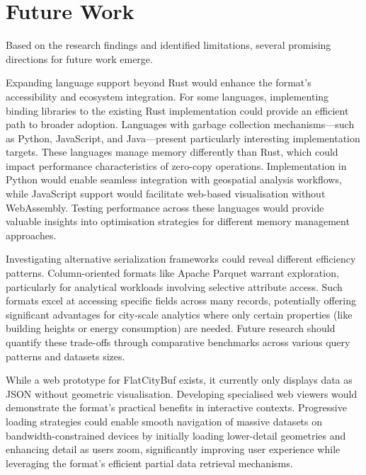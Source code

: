 \section{Future Work}
\label{conclusion:future_work}

Based on the research findings and identified limitations, several promising directions for future work emerge.

Expanding language support beyond Rust would enhance the format's accessibility and ecosystem integration. For some languages, implementing binding libraries to the existing Rust implementation could provide an efficient path to broader adoption.
Languages with garbage collection mechanisms—such as Python, JavaScript, and Java—present particularly interesting implementation targets. These languages manage memory differently than Rust, which could impact performance characteristics of zero-copy operations. Implementation in Python would enable seamless integration with geospatial analysis workflows, while JavaScript support would facilitate web-based visualisation without WebAssembly.
Testing performance across these languages would provide valuable insights into optimisation strategies for different memory management approaches.

Investigating alternative serialization frameworks could reveal different efficiency patterns. Column-oriented formats like Apache Parquet warrant exploration, particularly for analytical workloads involving selective attribute access. Such formats excel at accessing specific fields across many records, potentially offering significant advantages for city-scale analytics where only certain properties (like building heights or energy consumption) are needed. Future research should quantify these trade-offs through comparative benchmarks across various query patterns and datasets sizes.

While a web prototype for FlatCityBuf exists, it currently only displays data as JSON without geometric visualisation. Developing specialised web viewers would demonstrate the format's practical benefits in interactive contexts. Progressive loading strategies could enable smooth navigation of massive datasets on bandwidth-constrained devices by initially loading lower-detail geometries and enhancing detail as users zoom, significantly improving user experience while leveraging the format's efficient partial data retrieval mechanisms.
